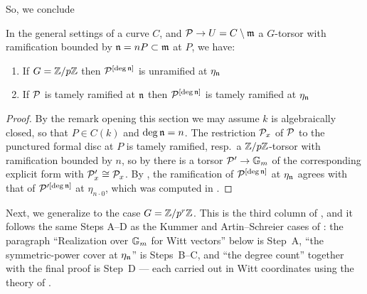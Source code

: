 So, we conclude 
\begin{cor}\label{cor:ramification_after_blowup_is_tame:reorg}
    In the general settings of a curve $C$, and $\mathcal{P} \to U=C \setminus \mathfrak{m}$ a $G$-torsor with ramification bounded by $\mathfrak{n} = n P \subset \mathfrak{m}$ at $P$, we have:
    \begin{enumerate}
        \item If $G=\mathbb{Z}/p\mathbb{Z}$ then $\mathcal{P}^{[\deg \mathfrak{n}]}$ is unramified at $\eta_{\mathfrak{n}}$
        \item If $\mathcal{P}$ is tamely ramified at $\mathfrak{n}$ then $\mathcal{P}^{[\deg \mathfrak{n}]}$ is tamely ramified at $\eta_{\mathfrak{n}}$
    \end{enumerate}
\end{cor}
\begin{proof}
    By the remark opening this section we may assume $k$ is algebraically closed, so that $P \in C(k)$ and
    $\deg \mathfrak{n} = n$. The restriction $\mathcal{P}_x$ of $\mathcal{P}$ to the punctured formal disc at $P$ is tamely ramified, resp.\ a
    $\mathbb{Z}/p\mathbb{Z}$-torsor with ramification bounded by $n$, so by  there is a torsor
    $\mathcal{P}' \to \mathbb{G}_m$ of the corresponding explicit form with $\mathcal{P}'_x \cong \mathcal{P}_x$. By , the
    ramification of $\mathcal{P}^{[\deg \mathfrak{n}]}$ at $\eta_{\mathfrak{n}}$ agrees with that of $\mathcal{P}'^{[\deg \mathfrak{n}]}$ at $\eta_{n \cdot 0}$,
    which was computed in .
\end{proof}



Next, we generalize to the case $G = \mathbb{Z}/p^r\mathbb{Z}$. This is the third column of
, and it follows the same
Steps A--D as the Kummer and Artin--Schreier cases of
: the paragraph
``Realization over $\mathbb{G}_m$ for Witt vectors'' below is Step~A, ``the
symmetric-power cover at $\eta_{\mathfrak{n}}$'' is Steps~B--C, and ``the degree count''
together with the final proof is Step~D --- each carried out in Witt
coordinates using the theory of
.

